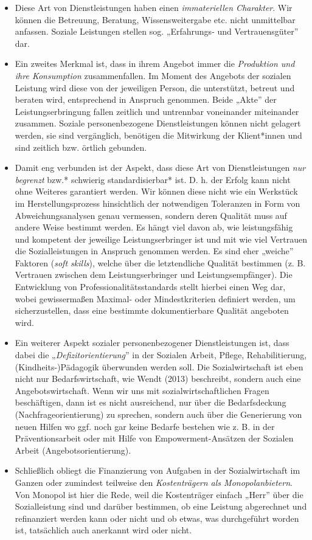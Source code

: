 \documentclass[
  letterpaper,
]{book}
\begin{document}
\begin{itemize}
\item
  Diese Art von Dienstleistungen haben einen \emph{immateriellen
  Charakter}. Wir können die Betreuung, Beratung, Wissensweitergabe etc.
  nicht unmittelbar anfassen. Soziale Leistungen stellen sog.
  „Erfahrungs- und Vertrauensgüter'' dar.
\item
  Ein zweites Merkmal ist, dass in ihrem Angebot immer die
  \emph{Produktion und ihre Konsumption} zusammenfallen. Im Moment des
  Angebots der sozialen Leistung wird diese von der jeweiligen Person,
  die unterstützt, betreut und beraten wird, entsprechend in Anspruch
  genommen. Beide „Akte'' der Leistungserbringung fallen zeitlich und
  untrennbar voneinander miteinander zusammen. Soziale personenbezogene
  Dienstleistungen können nicht gelagert werden, sie sind vergänglich,
  benötigen die Mitwirkung der Klient*innen und sind zeitlich bzw.
  örtlich gebunden.
\item
  Damit eng verbunden ist der Aspekt, dass diese Art von
  Dienstleistungen \emph{nur begrenzt }bzw.* schwierig standardisierbar*
  ist. D. h. der Erfolg kann nicht ohne Weiteres garantiert werden. Wir
  können diese nicht wie ein Werkstück im Herstellungsprozess
  hinsichtlich der notwendigen Toleranzen in Form von
  Abweichungsanalysen genau vermessen, sondern deren Qualität muss auf
  andere Weise bestimmt werden. Es hängt viel davon ab, wie
  leistungsfähig und kompetent der jeweilige Leistungserbringer ist und
  mit wie viel Vertrauen die Sozialleistungen in Anspruch genommen
  werden. Es sind eher „weiche'' Faktoren (\emph{soft skills}), welche
  über die letztendliche Qualität bestimmen (z. B. Vertrauen zwischen
  dem Leistungserbringer und Leistungsempfänger). Die Entwicklung von
  Professionalitätsstandards stellt hierbei einen Weg dar, wobei
  gewissermaßen Maximal- oder Mindestkriterien definiert werden, um
  sicherzustellen, dass eine bestimmte dokumentierbare Qualität
  angeboten wird.
\item
  Ein weiterer Aspekt sozialer personenbezogener Dienstleistungen ist,
  dass dabei die „\emph{Defizitorientierung}'' in der Sozialen Arbeit,
  Pflege, Rehabilitierung, (Kindheits-)Pädagogik überwunden werden soll.
  Die Sozialwirtschaft ist eben nicht nur Bedarfswirtschaft, wie Wendt
  (2013) beschreibt, sondern auch eine Angebotswirtschaft. Wenn wir uns
  mit sozialwirtschaftlichen Fragen beschäftigen, dann ist es nicht
  ausreichend, nur über die Bedarfsdeckung (Nachfrageorientierung) zu
  sprechen, sondern auch über die Generierung von neuen Hilfen wo ggf.
  noch gar keine Bedarfe bestehen wie z. B. in der Präventionsarbeit
  oder mit Hilfe von Empowerment-Ansätzen der Sozialen Arbeit
  (Angebotsorientierung).
\item
  Schließlich obliegt die Finanzierung von Aufgaben in der
  Sozialwirtschaft im Ganzen oder zumindest teilweise den
  \emph{Kostenträgern als Monopolanbietern}. Von Monopol ist hier die
  Rede, weil die Kostenträger einfach „Herr'' über die Sozialleistung
  sind und darüber bestimmen, ob eine Leistung abgerechnet und
  refinanziert werden kann oder nicht und ob etwas, was durchgeführt
  worden ist, tatsächlich auch anerkannt wird oder nicht.
\end{itemize}
\end{document}
